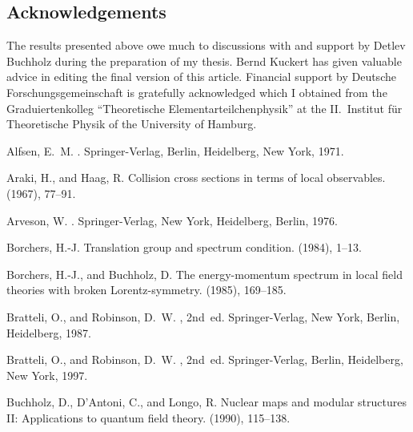 \documentclass[a4paper,a4paper]{article}
\numberwithin{equation}{section}
\theoremstyle{definition}
\theoremstyle{plain}
\theoremstyle{remark}
\theoremstyle{assumption}
\begin{document}
  \subsection*{Acknowledgements}
    The results presented above owe much to discussions with and
    support by Detlev Buchholz during the preparation of my thesis.
    Bernd Kuckert has given valuable advice in editing the final
    version of this article. Financial support by Deutsche
    Forschungsgemeinschaft is gratefully acknowledged which I obtained
    from the Graduiertenkolleg ``Theoretische
    Elementarteilchenphysik'' at the II.~Institut f\"ur Theoreti\-sche
    Physik of the University of Hamburg.


  
\providecommand{\SortNoop}[1]{}
\begin{thebibliography}{10}

{\sc Alfsen, E.~M.}
.
\newblock Sprin\-ger-Verlag, Berlin, Heidelberg, New York, 1971.

{\sc Araki, H., and Haag, R.}
\newblock Collision cross sections in terms of local observables.
 (1967), 77--91.

{\sc Arveson, W.}
.
\newblock Springer-Verlag, New York, Heidelberg, Berlin, 1976.

{\sc Borchers, H.-J.}
\newblock Translation group and spectrum condition.
 (1984), 1--13.

{\sc Borchers, H.-J., and Buchholz, D.}
\newblock The energy-momentum spectrum in local field theories with broken
  {Lorentz}-symmetry.
 (1985), 169--185.

{\sc Bratteli, O., and Robinson, D.~W.}
, 2nd~ed.
\newblock Springer-Verlag, New York, Berlin, Heidelberg, \SortNoop{79}1987.

{\sc Bratteli, O., and Robinson, D.~W.}
, 2nd~ed.
\newblock Springer-Verlag, Berlin, Heidelberg, New York, \SortNoop{97}1997.

{\sc Buchholz, D., D'Antoni, C., and Longo, R.}
\newblock Nuclear maps and modular structures {II}: Applications to quantum
  field theory.
 (1990), 115--138.


\end{thebibliography}
\end{document}
